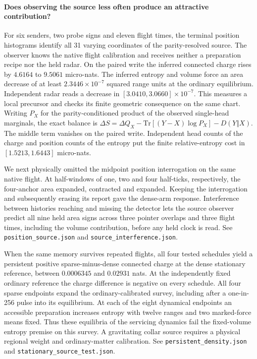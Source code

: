 \documentclass[11pt]{article}
\begin{document}
\paragraph{Does observing the source less often produce an attractive contribution?}
For six senders, two probe signs and eleven flight times, the terminal
position histograms identify all 31 varying coordinates of the
parity-resolved source. The observer knows the native flight calibration
and receives neither a preparation recipe nor the held radar. On the
paired write the inferred connected charge rises by \(4.6164\) to
\(9.5061\) micro-nats. The inferred entropy and volume force an area
decrease of at least \(2.3446\times10^{-7}\) squared range units at the
ordinary equilibrium. Independent radar reads a decrease in
\([3.0410,3.0660]\times10^{-7}\). This measures a local precursor
and checks its finite geometric consequence on the same chart.
Writing \(P_X\) for the parity-conditioned product of the observed
single-head marginals, the exact balance is
\(\Delta S=\Delta Q_X-\mathrm{Tr}[(Y-X)\log P_X]-D(Y\Vert X)\).
The middle term vanishes on the paired write. Independent head counts
of the charge and position counts of the entropy put the finite
relative-entropy cost in \([1.5213,1.6443]\) micro-nats.

We next physically omitted the midpoint position interrogation on the
same native flight. At half-windows of one, two and four half-ticks,
respectively, the four-anchor area expanded, contracted and expanded.
Keeping the interrogation and subsequently erasing its report gave the
dense-arm response. Interference between histories reaching and missing
the detector lets the source observer predict all nine held area signs
across three pointer overlaps and three flight times, including the
volume contribution, before any held clock is read. See
\texttt{position\_source.json} and \texttt{source\_interference.json}.

When the same memory survives repeated flights, all four tested
schedules yield a persistent positive sparse-minus-dense connected
charge at the dense stationary reference, between \(0.0006345\) and
\(0.02931\) nats. At the independently fixed ordinary reference the
charge difference is negative on every schedule. All four sparse
endpoints expand the ordinary-calibrated survey, including after a
one-in-256 pulse into its equilibrium. At each of the eight dynamical
endpoints an accessible preparation increases entropy with twelve
ranges and two marked-force means fixed. Thus these equilibria of
the servicing dynamics fail the fixed-volume entropy premise on this
survey. A gravitating collar source requires a physical regional weight
and ordinary-matter calibration. See
\texttt{persistent\_density.json} and \texttt{stationary\_source\_test.json}.
\end{document}
